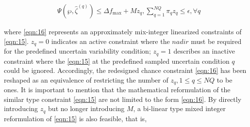 \documentclass[lettersize,journal]{IEEEtran}
\newenvironment{newsequation}{\small\begin{equation}}{\end{equation}}
\newenvironment{newsubequations}{\small\begin{subequations}}{\end{subequations}}
\begin{document}
\vspace{-0.125in}

\begin{small}
	\begin{align}\label{eqn:16}
		 & \Psi\!\left(\wp, \hat{\zeta}^{(q)}\!\right) \!\leq \!\varDelta f_{\text{max}} \!+\! M z_{q},\sum\nolimits_{q=1}^{NQ}  \pi_{q} z_{q}\! \leq \epsilon,\forall q
	\end{align}
\end{small}

\noindent where \eqref{eqn:16} represents an approximately mix-integer linearized constraints of \eqref{eqn:15}. $z_{q} = 0$ indicates an active constraint where the $nadir$ must be required for the predefined uncertain variability condition; $z_{{q}} = 1$ describes an inactive constraint where the \eqref{eqn:15} at the predefined sampled uncertain condition $q$ could be ignored. Accordingly, the redesigned chance constraint \eqref{eqn:16} has been reshaped as an equivalence of restricting the number of $z_{q}, 1\leq q\leq N\!Q$ to be ones. It is important to mention that the mathematical reformulation of the similar type constraint \eqref{eqn:15} are not limited to the form \eqref{eqn:16}. By directly introducing $z_{q}$ but no longer introducing $M$, a bi-linear type mixed integer reformulation of \eqref{eqn:15} is also feasible, that is,
\end{document}
